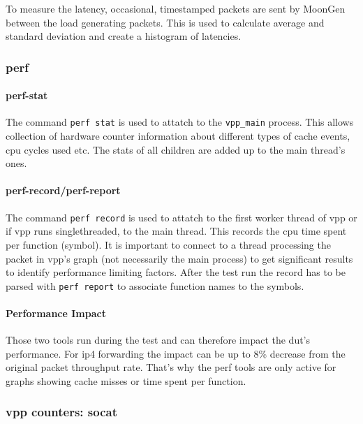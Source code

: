 To measure the latency, occasional, timestamped packets are sent by
MoonGen between the load generating packets. This is used to calculate
average and standard deviation and create a histogram of latencies.


\subsubsection{\Ac{perf}}

\paragraph{perf-stat} 

The command \lstinline|perf stat| is used to attatch to the
\lstinline|vpp_main| process. This allows collection of hardware
counter information about different types of cache events, cpu cycles
used etc. The stats of all children are added up to the main thread's
ones.

\paragraph{perf-record/perf-report}
\label{sec:perf}

The command \lstinline|perf record| is used to attatch to the first
worker thread of \Ac{vpp} or if vpp runs singlethreaded, to the main
thread. This records the cpu time spent per function (symbol). It is
important to connect to a thread processing the packet in \Ac{vpp}'s
graph (not necessarily the main process) to get significant results to
identify performance limiting factors. After the test run the record
has to be parsed with \lstinline|perf report| to associate function
names to the symbols. 

\paragraph{Performance Impact}

Those two tools run during the test and can therefore impact the
\Ac{dut}'s performance. For \Ac{ip4} forwarding the impact can be up
to 8\% decrease from the original packet throughput rate. That's why
the \Ac{perf} tools are only active for graphs showing cache misses or
time spent per function. 


\subsubsection{vpp counters: socat}
\label{sec:vppcounters}

